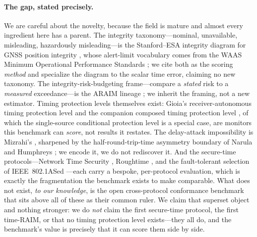 \paragraph{The gap, stated precisely.}
We are careful about the novelty, because the field is mature and almost every
ingredient here has a parent. The integrity taxonomy---nominal, unavailable,
misleading, hazardously misleading---is the Stanford--ESA integrity diagram for
GNSS position integrity \citep{tossaint2007}, whose alert-limit vocabulary comes
from the WAAS Minimum Operational Performance Standards \citep{rtcado229}; we cite
both as the scoring \emph{method} and specialize the diagram to the scalar time
error, claiming no new taxonomy. The integrity-risk-budgeting frame---compare a
\emph{stated} risk to a \emph{measured} exceedance---is the ARAIM lineage
\citep{blanch2015}; we inherit the framing, not a new estimator. Timing protection
levels themselves exist: Gioia's receiver-autonomous timing protection level
\citep{gioia2023} and the companion composed timing protection level
\citep{baweja2026cti}, of which the single-source conditional protection level
\citep{baweja2026tpl} is a special case, are monitors this benchmark can
\emph{score}, not results it restates. The delay-attack impossibility is
Mizrahi's \citep{mizrahi7384}, sharpened by the half-round-trip-time asymmetry
boundary of Narula and Humphreys \citep{narula2018}; we encode it, we do not
rediscover it. And the secure-time protocols---Network Time Security
\citep{rfc8915}, Roughtime \citep{roughtime}, and the fault-tolerant selection of
IEEE~802.1ASed \citep{ieee8021ased}---each carry a bespoke, per-protocol
evaluation, which is exactly the fragmentation the benchmark exists to make
comparable. What does not exist, \emph{to our knowledge}, is the open
cross-protocol conformance benchmark that sits above all of these as their common
ruler. We claim that superset object and nothing stronger: we do \emph{not} claim
the first secure-time protocol, the first time-RAIM, or that no timing protection
level exists---they all do, and the benchmark's value is precisely that it can
score them side by side.

